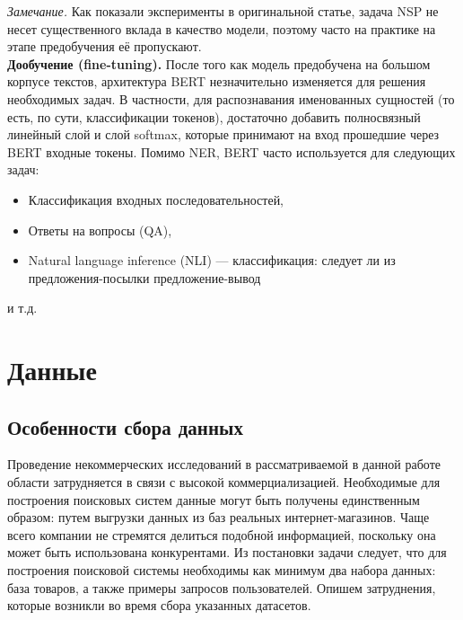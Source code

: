 \documentclass[12pt,a4paper]{article}
\begin{document}
\noindent \textit{Замечание.} Как показали эксперименты в оригинальной статье, задача NSP не несет существенного вклада в качество модели, поэтому часто на практике на этапе предобучения её пропускают.\\

\textbf{Дообучение (fine-tuning).} После того как модель предобучена на большом корпусе текстов, архитектура BERT незначительно изменяется для решения необходимых задач. В частности, для распознавания именованных сущностей (то есть, по сути, классификации токенов), достаточно добавить полносвязный линейный слой и слой softmax, которые принимают на вход прошедшие через BERT входные токены. Помимо NER, BERT часто используется для следующих задач:
\begin{itemize}
    \item Классификация входных последовательностей,
    \item Ответы на вопросы (QA),
    \item Natural language inference (NLI) --- классификация: следует ли из предложения-посылки предложение-вывод
\end{itemize}
\noindent и т.д.

\section{Данные}
\subsection{Особенности сбора данных}

Проведение некоммерческих исследований в рассматриваемой в данной работе области затрудняется в связи с высокой коммерциализацией. Необходимые для построения поисковых систем данные могут быть получены единственным образом: путем выгрузки данных из баз реальных интернет-магазинов. Чаще всего компании не стремятся делиться подобной информацией, поскольку она может быть использована конкурентами. Из постановки задачи следует, что для построения поисковой системы необходимы как минимум два набора данных: база товаров, а также примеры запросов пользователей. Опишем затруднения, которые возникли во время сбора указанных датасетов.
\end{document}
